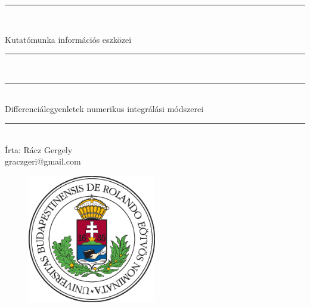 \documentclass[a4paper, 12pt]{article}
\begin{document}
\begin{titlepage}   
\begin{center}
\thispagestyle{empty}  

\vspace*{0.7cm}
\rule{\linewidth}{0.5mm} \\[3mm]
\vspace*{0.7cm}

{\LARGE Kutatómunka információs eszközei}

\vspace*{0.7cm}
\rule{\linewidth}{0.5mm} \\[3mm]
\rule{\linewidth}{0.5mm} \\[3mm]



{\Large Differenciálegyenletek numerikus integrálási módszerei\\}

\vspace*{0.7cm}
\rule{\linewidth}{0.5mm} \\[3mm]
{\footnotesize Írta: Rácz Gergely} \\
{\tiny graczgeri@gmail.com}
  \vspace*{2cm}

\begin{figure}[h!]
\begin{center}
\includegraphics[width=0.5\textwidth]{img/elte}
\end{center}
\end{figure}

\end{center}
\end{titlepage}
\end{document}
